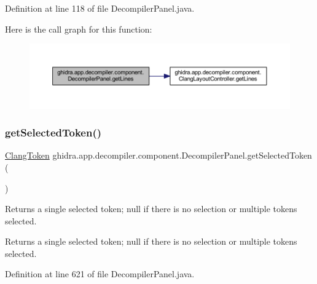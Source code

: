 Definition at line 118 of file Decompiler\+Panel.\+java.

Here is the call graph for this function\+:
\nopagebreak
\begin{figure}[H]
\begin{center}
\leavevmode
\includegraphics[width=350pt]{classghidra_1_1app_1_1decompiler_1_1component_1_1_decompiler_panel_ac6a17842ff6c5027d099161ea5a8a462_cgraph}
\end{center}
\end{figure}
\mbox{\label{classghidra_1_1app_1_1decompiler_1_1component_1_1_decompiler_panel_aedc72ee698aa7fdc9b1b2f892b0fc3db}} 
\subsubsection{\texorpdfstring{getSelectedToken()}{getSelectedToken()}}
{\footnotesize\ttfamily \mbox{\hyperlink{classghidra_1_1app_1_1decompiler_1_1_clang_token}{Clang\+Token}} ghidra.\+app.\+decompiler.\+component.\+Decompiler\+Panel.\+get\+Selected\+Token (\begin{DoxyParamCaption}{ }\end{DoxyParamCaption})\hspace{0.3cm}{\ttfamily [inline]}}

Returns a single selected token; null if there is no selection or multiple tokens selected. \begin{DoxyReturn}{Returns}
a single selected token; null if there is no selection or multiple tokens selected. 
\end{DoxyReturn}


Definition at line 621 of file Decompiler\+Panel.\+java.

